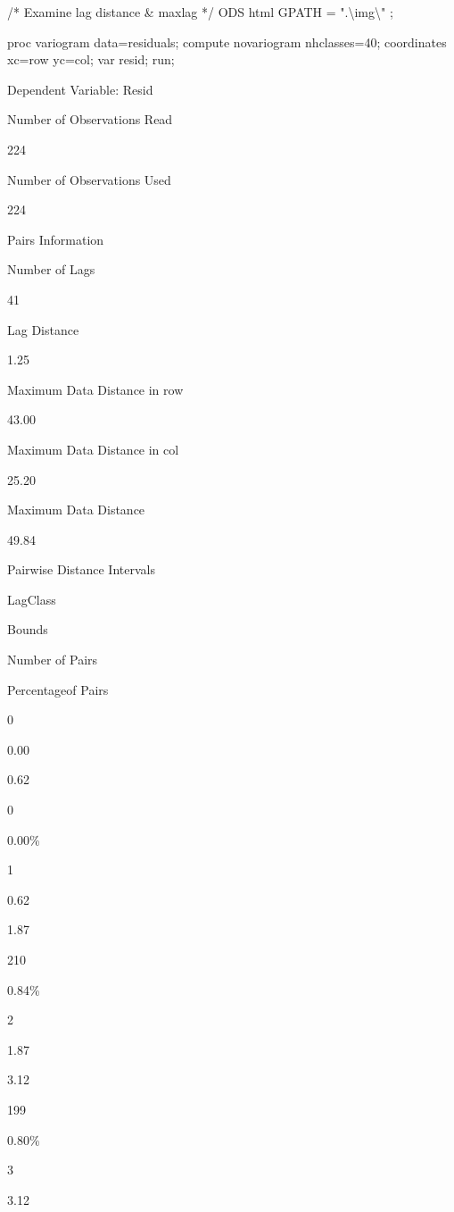 \documentclass[
]{book}
\newenvironment{Shaded}{\begin{snugshade}}{\end{snugshade}}
\newcommand{\NormalTok}[1]{#1}
\begin{document}
\begin{Shaded}
\begin{Highlighting}[]

\NormalTok{/* Examine lag distance \& maxlag */}
\NormalTok{ODS html GPATH = ".\textbackslash{}img\textbackslash{}" ;}

\NormalTok{proc variogram data=residuals;}
\NormalTok{   compute novariogram nhclasses=40;}
\NormalTok{   coordinates xc=row yc=col;}
\NormalTok{   var resid;}
\NormalTok{run;}
\end{Highlighting}
\end{Shaded}

Dependent Variable: Resid

Number of Observations Read

224

Number of Observations Used

224

Pairs Information

Number of Lags

41

Lag Distance

1.25

Maximum Data Distance in row

43.00

Maximum Data Distance in col

25.20

Maximum Data Distance

49.84

Pairwise Distance Intervals

LagClass

Bounds

Number of Pairs

Percentageof Pairs

0

0.00

0.62

0

0.00\%

1

0.62

1.87

210

0.84\%

2

1.87

3.12

199

0.80\%

3

3.12
\end{document}
